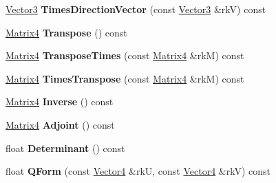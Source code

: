 \begin{DoxyCompactItemize}
\item 
\hyperlink{class_i_dream_sky_1_1_vector3}{Vector3} {\bfseries Times\+Direction\+Vector} (const \hyperlink{class_i_dream_sky_1_1_vector3}{Vector3} \&rkV) const \hypertarget{class_i_dream_sky_1_1_matrix4_abe60305d059b01bd482def7052a3c741}{}\label{class_i_dream_sky_1_1_matrix4_abe60305d059b01bd482def7052a3c741}

\item 
\hyperlink{class_i_dream_sky_1_1_matrix4}{Matrix4} {\bfseries Transpose} () const \hypertarget{class_i_dream_sky_1_1_matrix4_a9ce6921bf72832ec72b9a5252507f802}{}\label{class_i_dream_sky_1_1_matrix4_a9ce6921bf72832ec72b9a5252507f802}

\item 
\hyperlink{class_i_dream_sky_1_1_matrix4}{Matrix4} {\bfseries Transpose\+Times} (const \hyperlink{class_i_dream_sky_1_1_matrix4}{Matrix4} \&rkM) const \hypertarget{class_i_dream_sky_1_1_matrix4_a04b0a88cc6bb3bfeaf93679475ff4eb9}{}\label{class_i_dream_sky_1_1_matrix4_a04b0a88cc6bb3bfeaf93679475ff4eb9}

\item 
\hyperlink{class_i_dream_sky_1_1_matrix4}{Matrix4} {\bfseries Times\+Transpose} (const \hyperlink{class_i_dream_sky_1_1_matrix4}{Matrix4} \&rkM) const \hypertarget{class_i_dream_sky_1_1_matrix4_a72fa72a5e2547df9820400b94ba43c25}{}\label{class_i_dream_sky_1_1_matrix4_a72fa72a5e2547df9820400b94ba43c25}

\item 
\hyperlink{class_i_dream_sky_1_1_matrix4}{Matrix4} {\bfseries Inverse} () const \hypertarget{class_i_dream_sky_1_1_matrix4_a4f3281840519451dfac286f69a04e1ba}{}\label{class_i_dream_sky_1_1_matrix4_a4f3281840519451dfac286f69a04e1ba}

\item 
\hyperlink{class_i_dream_sky_1_1_matrix4}{Matrix4} {\bfseries Adjoint} () const \hypertarget{class_i_dream_sky_1_1_matrix4_a836971803f020fe9cb250826af2a68f2}{}\label{class_i_dream_sky_1_1_matrix4_a836971803f020fe9cb250826af2a68f2}

\item 
float {\bfseries Determinant} () const \hypertarget{class_i_dream_sky_1_1_matrix4_a341cc74b1f7c47d55646aadaeff4de38}{}\label{class_i_dream_sky_1_1_matrix4_a341cc74b1f7c47d55646aadaeff4de38}

\item 
float {\bfseries Q\+Form} (const \hyperlink{class_i_dream_sky_1_1_vector4}{Vector4} \&rkU, const \hyperlink{class_i_dream_sky_1_1_vector4}{Vector4} \&rkV) const \hypertarget{class_i_dream_sky_1_1_matrix4_a99ec5ea725aec8ba4dde74b1d984b13f}{}\label{class_i_dream_sky_1_1_matrix4_a99ec5ea725aec8ba4dde74b1d984b13f}


\end{DoxyCompactItemize}

